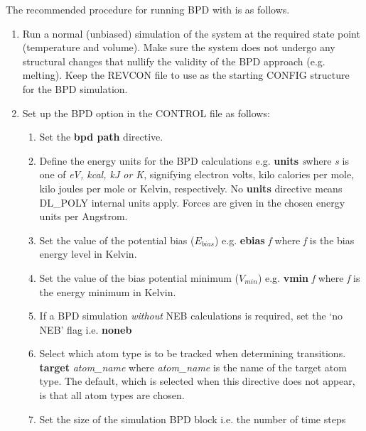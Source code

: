 The recommended procedure for running BPD with \D{} is as follows.
\begin{enumerate}
\item Run a normal (unbiased) simulation of the system at the required
state point (temperature and volume). Make sure the system does not
undergo any structural changes that nullify the validity of the BPD
approach (e.g. melting). Keep the REVCON file to use as the starting
CONFIG structure for the BPD simulation.
\item Set up the BPD option in the CONTROL file as follows:
\begin{enumerate}
\item Set the {\bf bpd path} directive.
\item Define the energy units for the BPD calculations e.g. \newline
      {\bf units} {\em s}\newline where {\em s} is one of {\em eV,
      kcal, kJ or K}, signifying electron volts, kilo calories per mole,
      kilo joules per mole or Kelvin, respectively. No {\bf units}
      directive means DL\_POLY internal units apply. Forces are given 
      in the chosen energy units per Angstrom.
\item Set the value of the potential bias ($E_{bias}$) e.g. \newline
      {\bf ebias} {\em f} \newline
      where {\em f} is the bias energy level in Kelvin.
\item Set the value of the bias potential minimum ($V_{min}$) e.g. \newline
      {\bf vmin} {\em f} \newline
      where {\em f} is the energy minimum in Kelvin.
\item If a BPD simulation {\em without} NEB calculations is required, set the
      `no NEB' flag i.e. \newline
      {\bf noneb} \newline
\item Select which atom type is to be tracked when determining transitions.
      \newline
      {\bf target} {\em atom\_name} \newline
      where {\em atom\_name} is the name of the target atom type. The default,
      which is selected when this directive does not appear, is that all atom
      types are chosen.
\item Set the size of the simulation BPD block i.e. the number of time steps

\end{enumerate}
\end{enumerate}
